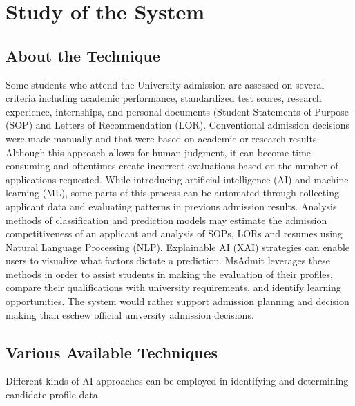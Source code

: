 

\chapter{Study of the System}
\newpage
\label{chap2}

\section{About the Technique}

Some students who attend the University admission are assessed on several criteria including academic performance, standardized test scores, research experience, internships, and personal documents (Student Statements of Purpose (SOP) and Letters of Recommendation (LOR). Conventional admission decisions were made manually and that were based on academic or research results. Although this approach allows for human judgment, it can become time-consuming and oftentimes create incorrect evaluations based on the number of applications requested. While introducing artificial intelligence (AI) and machine learning (ML), some parts of this process can be automated through collecting applicant data and evaluating patterns in previous admission results. Analysis methods of classification and prediction models may estimate the admission competitiveness of an applicant and analysis of SOPs, LORs and resumes using Natural Language Processing (NLP). Explainable AI (XAI) strategies can enable users to visualize what factors dictate a prediction. MsAdmit leverages these methods in order to assist students in making the evaluation of their profiles, compare their qualifications with university requirements, and identify learning opportunities. The system would rather support admission planning and decision making than eschew official university admission decisions.

\section{Various Available Techniques}

Different kinds of AI approaches can be employed in identifying and determining candidate profile data.

